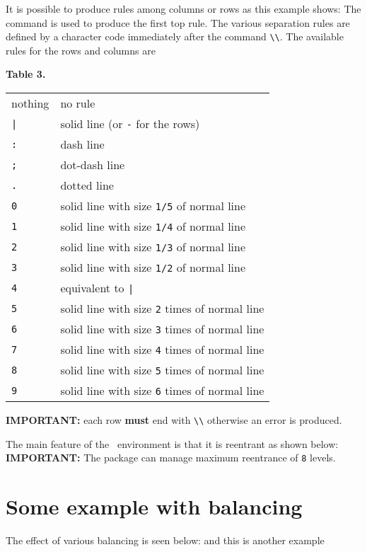 \documentclass[a4paper,final,11pt]{article}
\begin{document}
It is possible to produce rules among columns or rows as this 
example shows:
The command  is used to produce the first top rule. The 
various separation rules are defined by a character code immediately 
after the command \verb+\\+.
The available rules for the rows and columns are
%
\begin{center}
\textbf{Table 3.}\nobreak\\
\begin{tabular}{|l|l|}
\hline
nothing  & no rule \\
\verb+|+ & solid line (or \verb+-+ for the rows) \\
\verb+:+ & dash line \\
\verb+;+ & dot-dash line \\
\verb+.+ & dotted line \\
\verb+0+ & solid line with size \verb|1/5| of normal line \\
\verb+1+ & solid line with size \verb|1/4| of normal line \\
\verb+2+ & solid line with size \verb|1/3| of normal line \\
\verb+3+ & solid line with size \verb|1/2| of normal line \\
\verb+4+ & equivalent to \verb+|+ \\
\verb+5+ & solid line with size \verb|2| times of normal line \\
\verb+6+ & solid line with size \verb|3| times of normal line \\
\verb+7+ & solid line with size \verb|4| times of normal line \\
\verb+8+ & solid line with size \verb|5| times of normal line \\
\verb+9+ & solid line with size \verb|6| times of normal line \\
\hline
\end{tabular}
\end{center}

\textbf{IMPORTANT:} each row \textbf{must} end with \verb+\\+ 
otherwise an error is produced.

The main feature of the ~environment
is that it is reentrant as shown below:
\textbf{IMPORTANT:} The package can manage maximum reentrance 
of \verb|8| levels.


\section{Some example with balancing}
The effect of various balancing is seen below:
and this is another example
\end{document}
